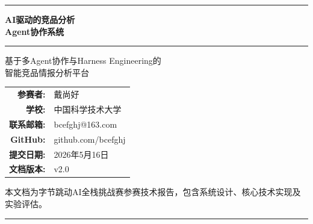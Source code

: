 \documentclass[12pt,a4paper]{ctexrep}
\begin{document}
\begin{titlepage}
\centering
\vspace*{2cm}

{\color{bytedance}\rule{\linewidth}{2pt}}
\vspace{0.8cm}

{\fontsize{36}{42}\selectfont\bfseries\color{primary}
AI驱动的竞品分析\\[0.3cm]Agent协作系统}

\vspace{0.6cm}
{\color{bytedance}\rule{0.6\linewidth}{1pt}}

\vspace{1.2cm}
{\LARGE\color{secondary}
基于多Agent协作与Harness Engineering的\\[0.2cm]
智能竞品情报分析平台}

\vspace{2cm}


\vspace{2cm}

{\large
\begin{tabular}{rl}
\textbf{参赛者:} & 戴尚好 \\[0.3cm]
\textbf{学校:} & 中国科学技术大学 \\[0.3cm]
\textbf{联系邮箱:} & bcefghj@163.com \\[0.3cm]
\textbf{GitHub:} & github.com/bcefghj \\[0.3cm]
\textbf{提交日期:} & 2026年5月16日 \\[0.3cm]
\textbf{文档版本:} & v2.0 \\
\end{tabular}
}

\vfill
{\small\color{gray} 本文档为字节跳动AI全栈挑战赛参赛技术报告，包含系统设计、核心技术实现及实验评估。}

\vspace{0.5cm}
{\color{bytedance}\rule{\linewidth}{2pt}}
\end{titlepage}
\end{document}
